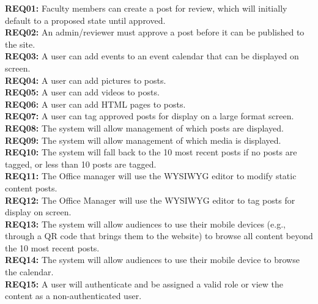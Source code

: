 \textbf{REQ01:} Faculty members can create a post for review, which will initially default to a proposed state until approved. \\
\textbf{REQ02:} An admin/reviewer must approve a post before it can be published to the site. \\
\textbf{REQ03:} A user can add events to an event calendar that can be displayed on screen. \\
\textbf{REQ04:} A user can add pictures to posts. \\
\textbf{REQ05:} A user can add videos to posts. \\
\textbf{REQ06:} A user can add HTML pages to posts. \\
\textbf{REQ07:} A user can tag approved posts for display on a large format screen. \\
\textbf{REQ08:} The system will allow management of which posts are displayed. \\
\textbf{REQ09:} The system will allow management of which media is displayed. \\
\textbf{REQ10:} The system will fall back to the 10 most recent posts if no posts are tagged, or less than 10 posts are tagged. \\
\textbf{REQ11:} The Office manager will use the WYSIWYG editor to modify static content posts. \\
\textbf{REQ12:} The Office Manager will use the WYSIWYG editor to tag posts for display on screen. \\
\textbf{REQ13:} The system will allow audiences to use their mobile devices (e.g., through a QR code that brings them to the website) to browse all content beyond the 10 most recent posts. \\
\textbf{REQ14:} The system will allow audiences to use their mobile device to browse the calendar. \\
\textbf{REQ15:} A user will authenticate and be assigned a valid role or view the content as a non-authenticated user. \\